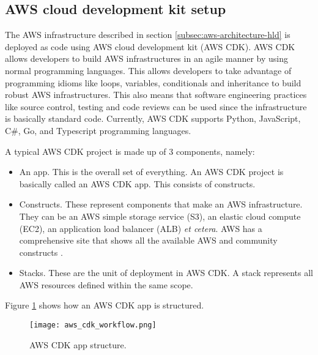 


\subsection{AWS cloud development kit setup}
\label{subsec:aws-cdk-setup}

The AWS infrastructure described in section \ref{subsec:aws-architecture-hld} is deployed as code using AWS cloud development kit (AWS CDK). AWS CDK allows developers to build AWS infrastructures in an agile manner by using normal programming languages. This allows developers to take advantage of programming idioms like loops, variables, conditionals and inheritance to build robust AWS infrastructures. This also means that software engineering practices like source control, testing and code reviews can be used since the infrastructure is basically standard code. Currently, AWS CDK supports Python, JavaScript, C\#, Go, and Typescript programming languages.

A typical AWS CDK project is made up of 3 components, namely:

\begin{itemize}
    \item An app. This is the overall set of everything. An AWS CDK project is basically called an AWS CDK app. This consists of constructs.
    \item Constructs. These represent components that make an AWS infrastructure. They can be an AWS simple storage service (S3), an elastic cloud compute (EC2), an application load balancer (ALB) \textit{et cetera}. AWS has a comprehensive site that shows all the available AWS and community constructs \cite{awsconstructhub}.
    \item Stacks. These are the unit of deployment in AWS CDK. A stack represents all AWS resources defined within the same scope.
\end{itemize}

Figure \ref{fig:aws-cdk-app-structure} shows how an AWS CDK app is structured.

\begin{figure}[H]
    \centering \texttt{[image: aws\_cdk\_workflow.png]}
    \caption{AWS CDK app structure.}
    \label{fig:aws-cdk-app-structure}
\end{figure}

